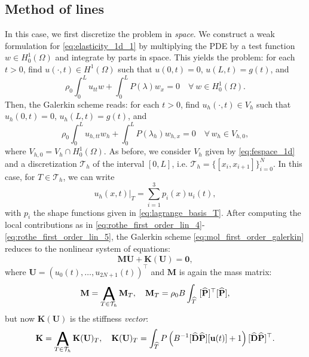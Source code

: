 \documentclass{sfuthesis}
\numberwithin{equation}{section}
\numberwithin{figure}{chapter}
\numberwithin{table}{chapter}
\theoremstyle{definition}
\def\*#1{{\mathbf{#1}}} %
\DeclareMathOperator*{\assembly}{\scalerel*{\mathsf{A}}{\sum}}
\begin{document}
\subsection{Method of lines} \label{sec:mol_first_order}

In this case, we first discretize the problem in \textit{space}. We construct a weak formulation for \eqref{eq:elasticity_1d_1} by multiplying the PDE by a test function $w \in H_0^1(\Omega)$ and integrate by parts in space. This yields the problem: for each $t > 0$, find $u(\cdot, t) \in H^1(\Omega)$ such that $u(0,t) = 0$, $u(L,t) = g(t)$, and
\begin{equation}
	\rho_0 \int_0^L u_{tt} w + \int_0^L P(\lambda) w_x = 0 \quad \forall \ w \in H_0^1(\Omega).
\end{equation} 
Then, the Galerkin scheme reads: for each $t>0$, find $u_h(\cdot, t) \in V_h$ such that $u_h(0,t) = 0$, $u_h(L,t) = g(t)$, and
\begin{equation} \label{eq:mol_first_order_galerkin}
	\rho_0 \int_0^L u_{h,tt} w_h + \int_0^L P(\lambda_h) w_{h,x} = 0 \quad \forall \, w_h \in V_{h,0},
\end{equation} 
where $V_{h,0} = V_h \cap H_0^1(\Omega)$. As before, we consider $V_h$ given by \eqref{eq:fespace_1d} and a discretization $\mathcal{T}_h$ of the interval $[0,L]$, i.e. $\mathcal{T}_h = \{ [x_i,x_{i+1}] \}_{i=0}^N$. In this case, for $T \in \mathcal{T}_h$, we can write
\begin{equation}
    u_h(x,t)\Big|_T = \sum_{i=1}^3 p_i(x)u_i(t),
\end{equation}
with $p_i$ the shape functions given in \eqref{eq:lagrange_basis_T}. After computing the local contributions as in \eqref{eq:rothe_first_order_lin_4}-\eqref{eq:rothe_first_order_lin_5}, the Galerkin scheme \eqref{eq:mol_first_order_galerkin}
reduces to the nonlinear system of equations:
\begin{equation} \label{eq:mol}
	\*M \ddot{\*U} + \*K(\*U) = \*0,
\end{equation}
where $\*U = \left( u_0(t), \dots, u_{2N+1}(t) \right)^\top$ and $\*M$ is again the mass matrix:
\begin{equation}
    \*M = \assembly_{T \in \mathcal{T}_h} \*M_T, \quad \*M_T = \rho_0 B \int_{\widehat{T}} \ [\widehat{\*P}]^\top [\widehat{\*P}],
\end{equation}
but now $\*K(\*U)$ is the stiffness \textit{vector}:
\begin{equation} \label{eq:mol_first_order_def_stiffness_vector}
    \*K = \assembly_{T \in \mathcal{T}_h} \*K(\*U)_T, \quad \*K(\*U)_T = \int_{\widehat{T}} P\left( B^{-1} [\widehat{\*D}\widehat{\*P}][\*u(t)] + 1 \right) [\widehat{\*D}\widehat{\*P}]^\top.
\end{equation}
\end{document}
